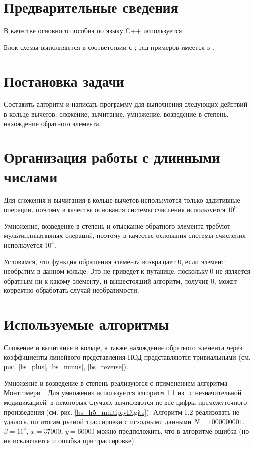 \documentclass[a4paper,12pt]{article} %
\begin{document}
\setcounter{page}{2}

\section*{Предварительные сведения}

В качестве основного пособия по языку C++ используется \cite{chmyhalo}.


Блок-схемы выполняются в соответствии с \cite{gost-block-scheme};
ряд примеров имеется в \cite{wiki-block-scheme}.


\section*{Постановка задачи}
Составить алгоритм и написать программу
для выполнения следующих действий в кольце вычетов:
сложение, вычитание, умножение, возведение в степень,
нахождение обратного элемента.


\section*{Организация работы с длинными числами}
Для сложения и вычитания в кольце вычетов используются только аддитивные операции,
поэтому в качестве основания системы счисления используется $10^9$.

Умножение, возведение в степень и отыскание обратного элемента требуют
мультипликативных операций,
поэтому в качестве основания системы счисления используется $10^4$.

Условимся, что функция обращения элемента возвращает 0,
если элемент необратим в данном кольце.
Это не приведёт к путанице, поскольку 0 не является обратным ни к какому элементу,
и вышестоящий алгоритм, получив 0, может корректно обработать случай необратимости.

\section*{Используемые алгоритмы}

Сложение и вычитание в кольце,
а также нахождение обратного элемента через коэффициенты линейного представления НОД
представляются тривиальными (см. рис. \ref{bs_plus}, \ref{bs_minus}, \ref{bs_reverse}).

Умножение и возведение в степень реализуются с применением алгоритма Монтгомери~\cite{Glukhov}.
Для умножения используется алгоритм 1.1 из~\cite{Glukhov} с незначительной модицикацией:
в некоторых случаях вычисляются не все цифры промежуточного произведения (см. рис. \ref{bs_lr5_multiplyDigits}).
Алгоритм 1.2 реализовать не удалось, по итогам ручной трассировки с исходными данными
$N=1000000001$, $\beta=10^4$, $x=37000$, $y=60000$ можно предположить,
что в алгоритме ошибка (но не исключается и ошибка при трассировке).
\end{document}
